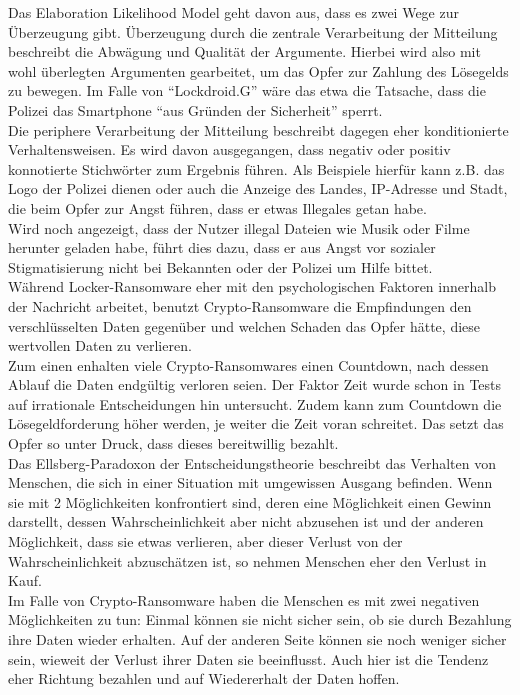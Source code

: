 Das Elaboration Likelihood Model geht davon aus, dass es zwei Wege zur Überzeugung gibt. Überzeugung durch die zentrale Verarbeitung der Mitteilung beschreibt die Abwägung und Qualität der Argumente. Hierbei wird also mit wohl überlegten Argumenten gearbeitet, um das Opfer zur Zahlung des Lösegelds zu bewegen. Im Falle von ``Lockdroid.G'' wäre das etwa die Tatsache, dass die Polizei das Smartphone ``aus Gründen der Sicherheit'' sperrt.\\
Die periphere Verarbeitung der Mitteilung beschreibt dagegen eher konditionierte Verhaltensweisen. Es wird davon ausgegangen, dass negativ oder positiv konnotierte Stichwörter zum Ergebnis führen. Als Beispiele hierfür kann z.B. das Logo der Polizei dienen oder auch die Anzeige des Landes, IP-Adresse und Stadt, die beim Opfer zur Angst führen, dass er etwas Illegales getan habe. \\

Wird noch angezeigt, dass der Nutzer illegal Dateien wie Musik oder Filme herunter geladen habe, führt dies dazu, dass er aus Angst vor sozialer Stigmatisierung nicht bei Bekannten oder der Polizei um Hilfe bittet.\\

Während Locker-Ransomware eher mit den psychologischen Faktoren innerhalb der Nachricht arbeitet, benutzt Crypto-Ransomware die Empfindungen den verschlüsselten Daten gegenüber und welchen Schaden das Opfer hätte, diese wertvollen Daten zu verlieren.\\

Zum einen enhalten viele Crypto-Ransomwares einen Countdown, nach dessen Ablauf die Daten endgültig verloren seien. Der Faktor Zeit wurde schon in Tests auf irrationale Entscheidungen hin untersucht. Zudem kann zum Countdown die Lösegeldforderung höher werden, je weiter die Zeit voran schreitet. Das setzt das Opfer so unter Druck, dass dieses bereitwillig bezahlt.\\
Das Ellsberg-Paradoxon der Entscheidungstheorie beschreibt das Verhalten von Menschen, die sich in einer Situation mit umgewissen Ausgang befinden. Wenn sie mit 2 Möglichkeiten konfrontiert sind, deren eine Möglichkeit einen Gewinn darstellt, dessen Wahrscheinlichkeit aber nicht abzusehen ist und der anderen Möglichkeit, dass sie etwas verlieren, aber dieser Verlust von der Wahrscheinlichkeit abzuschätzen ist, so nehmen Menschen eher den Verlust in Kauf.\\
Im Falle von Crypto-Ransomware haben die Menschen es mit zwei negativen Möglichkeiten zu tun: Einmal können sie nicht sicher sein, ob sie durch Bezahlung ihre Daten wieder erhalten. Auf der anderen Seite können sie noch weniger sicher sein, wieweit der Verlust ihrer Daten sie beeinflusst. Auch hier ist die Tendenz eher Richtung bezahlen und auf Wiedererhalt der Daten hoffen.

